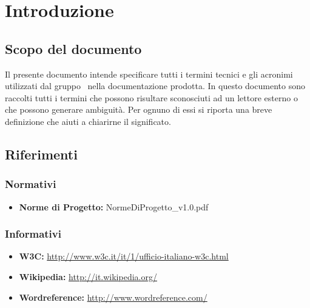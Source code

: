\section{Introduzione}
\subsection{Scopo del documento}
Il presente documento intende specificare tutti i termini tecnici e gli acronimi utilizzati dal gruppo \gruppo\ nella documentazione prodotta. In questo documento sono raccolti tutti i termini che possono risultare sconosciuti ad un lettore esterno o che possono generare ambiguità. Per ognuno di essi si riporta una breve definizione che aiuti a chiarirne il significato.

\subsection{Riferimenti}
\subsubsection{Normativi}
\begin{itemize}
	\item \textbf{Norme di Progetto:} NormeDiProgetto\_v1.0.pdf
\end{itemize}
\subsubsection{Informativi}
\begin{itemize}
	\item \textbf{W3C:} \href{http://www.w3c.it/it/1/ufficio-italiano-w3c.html}{http://www.w3c.it/it/1/ufficio-italiano-w3c.html}
	\item \textbf{Wikipedia:} \href{http://it.wikipedia.org/}{http://it.wikipedia.org/} 
	\item \textbf{Wordreference:} \href{http://www.wordreference.com/}{http://www.wordreference.com/} 
\end{itemize}